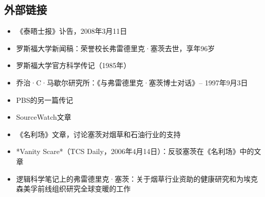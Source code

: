 \subsection{外部链接}
\begin{itemize}
\item 《泰晤士报》讣告，2008年3月11日
\item 罗斯福大学新闻稿：荣誉校长弗雷德里克·塞茨去世，享年96岁
\item 罗斯福大学官方科学传记（1985年）
\item 乔治·C·马歇尔研究所：《与弗雷德里克·塞茨博士对话》– 1997年9月3日
\item PBS的另一篇传记
\item SourceWatch文章
\item 《名利场》文章，讨论塞茨对烟草和石油行业的支持
\item *Vanity Scare*（TCS Daily，2006年4月14日）：反驳塞茨在《名利场》中的文章
\item 逻辑科学笔记上的弗雷德里克·塞茨：关于烟草行业资助的健康研究和为埃克森美孚前线组织研究全球变暖的工作
\end{itemize}